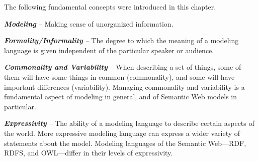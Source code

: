 The following fundamental concepts were introduced in this chapter.

\emph{\textbf{Modeling}} \emph{--} Making sense of unorganized
information.

\emph{\textbf{Formality/Informality}} \emph{--} The degree to which the
meaning of a modeling language is given independent of the particular
speaker or audience.

\emph{\textbf{Commonality and Variability}} \emph{--} When describing a
set of things, some of them will have some things in common
(commonality), and some will have important differences (variability).
Managing commonality and variability is a fundamental aspect of modeling
in general, and of Semantic Web models in particular.

\emph{\textbf{Expressivity}} \emph{--} The ability of a modeling
language to describe certain aspects of the world. More expressive
modeling language can express a wider variety of statements about the
model. Modeling languages of the Semantic Web---RDF, RDFS, and
OWL---differ in their levels of expressivity.
